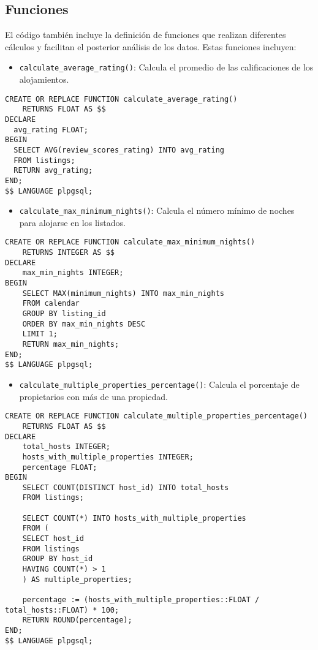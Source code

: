 \subsection{Funciones}

El código también incluye la definición de funciones que realizan diferentes cálculos y facilitan el posterior análisis de los datos. Estas funciones incluyen:

\begin{itemize}
    \item \texttt{calculate\_average\_rating()}: Calcula el promedio de las calificaciones de los alojamientos.
\end{itemize}
    \small 
    \begin{verbatim}
CREATE OR REPLACE FUNCTION calculate_average_rating() 
    RETURNS FLOAT AS $$
DECLARE
  avg_rating FLOAT;
BEGIN
  SELECT AVG(review_scores_rating) INTO avg_rating
  FROM listings;
  RETURN avg_rating;
END;
$$ LANGUAGE plpgsql;
    \end{verbatim}
\begin{itemize}
    \item \texttt{calculate\_max\_minimum\_nights()}: Calcula el número mínimo de noches para alojarse en los listados.
\end{itemize}
    \small 
    \begin{verbatim}
CREATE OR REPLACE FUNCTION calculate_max_minimum_nights()
    RETURNS INTEGER AS $$
DECLARE
    max_min_nights INTEGER;
BEGIN
    SELECT MAX(minimum_nights) INTO max_min_nights
    FROM calendar
    GROUP BY listing_id
    ORDER BY max_min_nights DESC
    LIMIT 1;
    RETURN max_min_nights;
END;
$$ LANGUAGE plpgsql;
    \end{verbatim}
\begin{itemize}
    \item \texttt{calculate\_multiple\_properties\_percentage()}: Calcula el porcentaje de propietarios con más de una propiedad.
\end{itemize}
    \small 
    \begin{verbatim}
CREATE OR REPLACE FUNCTION calculate_multiple_properties_percentage()
    RETURNS FLOAT AS $$
DECLARE
    total_hosts INTEGER;
    hosts_with_multiple_properties INTEGER;
    percentage FLOAT;
BEGIN
    SELECT COUNT(DISTINCT host_id) INTO total_hosts
    FROM listings;

    SELECT COUNT(*) INTO hosts_with_multiple_properties
    FROM (
    SELECT host_id
    FROM listings
    GROUP BY host_id
    HAVING COUNT(*) > 1
    ) AS multiple_properties;

    percentage := (hosts_with_multiple_properties::FLOAT / total_hosts::FLOAT) * 100;
    RETURN ROUND(percentage);
END;
$$ LANGUAGE plpgsql;
    \end{verbatim}

\newpage